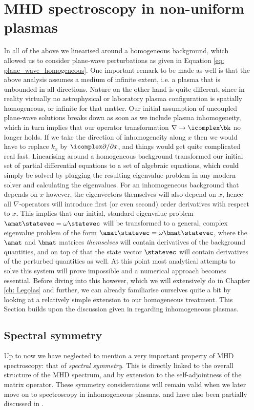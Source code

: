 \section{MHD spectroscopy in non-uniform plasmas}
In all of the above we linearised around a homogeneous background, which allowed us to consider plane-wave perturbations as given in Equation \eqref{eq: plane_wave_homogeneous}. One important remark to be made as well is that the above analysis assumes a medium of infinite extent, i.e. a plasma that is unbounded in all directions.
Nature on the other hand is quite different, since in reality virtually no astrophysical or laboratory plasma configuration is spatially homogeneous, or infinite for that matter. Our initial assumption of uncoupled plane-wave solutions breaks down as soon as we include plasma inhomogeneity, which in turn implies that our operator transformation $\nabla \rightarrow \icomplex\bk$ no longer holds. If we take the direction of inhomogeneity along $x$ then we would have to replace $k_x$ by $\icomplex\partial / \partial x$, and things would get quite complicated real fast. Linearising around a homogeneous background transformed our initial set of partial differential equations to a set of algebraic equations, which could simply be solved by plugging the resulting eigenvalue problem in any modern solver and calculating the eigenvalues. For an inhomogeneous background that depends on $x$ however, the eigenvectors themselves will also depend on $x$, hence all $\nabla$-operators will introduce first (or even second) order derivatives with respect to $x$. This implies that our initial, standard eigenvalue problem $\amat \statevec = \omega \statevec$ will be transformed to a general, complex eigenvalue problem of the form $\amat \statevec = \omega \bmat \statevec$, where the $\amat$ and $\bmat$ matrices \emph{themselves} will contain derivatives of the background quantities, and on top of that the state vector $\statevec$ will contain derivatives of the perturbed quantities as well. At this point most analytical attempts to solve this system will prove impossible and a numerical approach becomes essential.
Before diving into this however, which we will extensively do in Chapter \ref{ch: Legolas} and further, we can already familiarise ourselves quite a bit by looking at a relatively simple extension to our homogeneous treatment. This Section builds upon the discussion given in \citet{book_MHD} regarding inhomogeneous plasmas.

\subsection{Spectral symmetry}
Up to now we have neglected to mention a very important property of MHD spectroscopy: that of \emph{spectral symmetry}. This is directly linked to the overall structure of the MHD spectrum, and by extension to the self-adjointness of the matrix operator. These symmetry considerations will remain valid when we later move on to spectroscopy in inhomogeneous plasmas, and have also been partially discussed in \citet{legolas_paper}.

